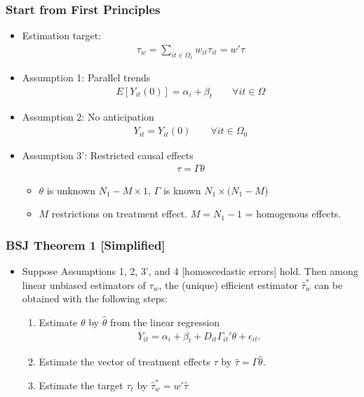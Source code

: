 \documentclass[english,xcolor=svgnames]{beamer}
\begin{document}
\begin{frame}
\frametitle[alignment=center]{Start from First Principles}
\begin{itemize}
	\item Estimation target:
	\begin{align*}
		\tau_w = \sum_{it\in\Omega_1} w_{it}\tau_{it} = w'\tau
	\end{align*}
	\item Assumption 1: Parallel trends 
	\begin{align*}
		E[Y_{it}(0)] = \alpha_i + \beta_t \qquad\forall it\in \Omega
	\end{align*}
	\item Assumption 2: No anticipation
	\begin{align*}
		Y_{it}=Y_{it}(0) \qquad\forall it\in \Omega_0
	\end{align*}
	\item Assumption 3': Restricted causal effects
	\begin{align*}
		\tau =\Gamma \theta 
	\end{align*}
	\begin{itemize}
		\item $\theta$ is unknown $N_1-M \times 1$, $\Gamma$ is known $N_1\times (N_1-M$)
		\item $M$ restrictions on treatment effect. $M=N_1-1$ = homogenous effects.
	\end{itemize}
\end{itemize}
\end{frame}

\begin{frame}
\frametitle[alignment=center]{BSJ Theorem 1 [Simplified]}
\begin{itemize}
	\item Suppose Assumptions 1, 2, 3', and 4 [homoscedastic errors] hold. Then among linear unbiased estimators of $\tau_w$, the (unique) efficient estimator $\hat{\tau}_w^*$ can be obtained with the following steps:
	\begin{enumerate}
		\item Estimate $\theta$ by $\hat{\theta}$ from the linear regression
		\begin{align*}
			Y_{it} = \alpha_i + \beta_t + D_{it}\Gamma_{it}'\theta + \epsilon_{it}.
		\end{align*}
		\item Estimate the vector of treatment effects $\tau$ by $\hat{\tau}=\Gamma \hat{\theta}$.
		\item Estimate the target $\tau_t$ by $\hat{\tau}_w^* = w'\hat{\tau}$
	\end{enumerate}
\end{itemize}
\end{frame}
\end{document}
